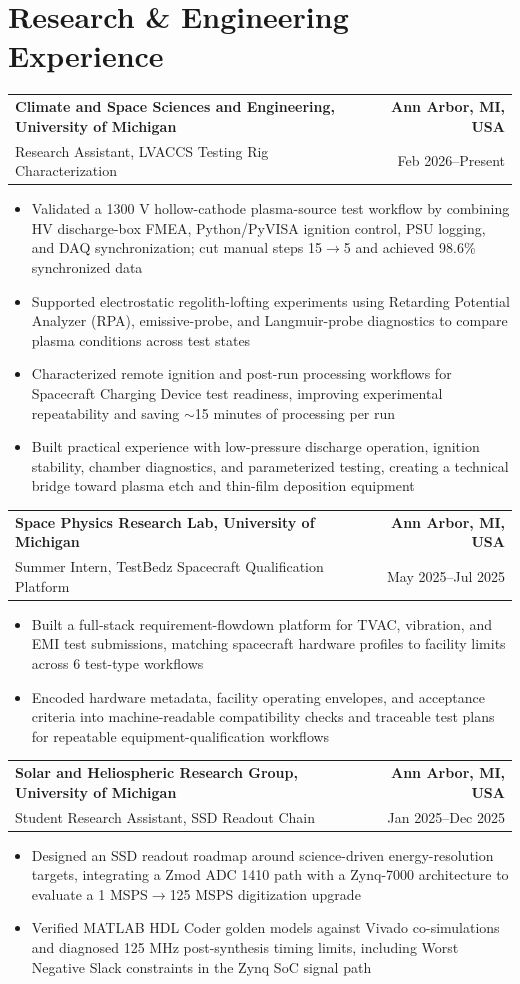 \documentclass[10pt,a4paper]{article}
\makeatletter
\newcommand{\resumeSubheading}[4]{%
  \begin{tabular*}{\textwidth}{@{\extracolsep{\fill}}l r}
    \textbf{#1} & \textcolor{nameblue}{\textbf{#2}} \\
    #3 & #4
  \end{tabular*}\vspace{-1.6pt}
}
\newcommand{\resumeItemsStart}{\begin{itemize}}
\newcommand{\resumeItemsEnd}{\end{itemize}\vspace{-1.1pt}}
\newcommand{\resumeItem}[1]{\item #1}
\makeatother
\begin{document}
\section{Research \& Engineering Experience}

\resumeSubheading
  {Climate and Space Sciences and Engineering, University of Michigan}{Ann Arbor, MI, USA}
  {Research Assistant, LVACCS Testing Rig Characterization}{Feb 2026--Present}
\resumeItemsStart
  \resumeItem{Validated a 1300 V hollow-cathode plasma-source test workflow by combining HV discharge-box FMEA, Python/PyVISA ignition control, PSU logging, and DAQ synchronization; cut manual steps 15$\rightarrow$5 and achieved 98.6\% synchronized data}
  \resumeItem{Supported electrostatic regolith-lofting experiments using Retarding Potential Analyzer (RPA), emissive-probe, and Langmuir-probe diagnostics to compare plasma conditions across test states}
  \resumeItem{Characterized remote ignition and post-run processing workflows for Spacecraft Charging Device test readiness, improving experimental repeatability and saving $\sim$15 minutes of processing per run}
  \resumeItem{Built practical experience with low-pressure discharge operation, ignition stability, chamber diagnostics, and parameterized testing, creating a technical bridge toward plasma etch and thin-film deposition equipment}
\resumeItemsEnd

\resumeSubheading
  {Space Physics Research Lab, University of Michigan}{Ann Arbor, MI, USA}
  {Summer Intern, TestBedz Spacecraft Qualification Platform}{May 2025--Jul 2025}
\resumeItemsStart
  \resumeItem{Built a full-stack requirement-flowdown platform for TVAC, vibration, and EMI test submissions, matching spacecraft hardware profiles to facility limits across 6 test-type workflows}
  \resumeItem{Encoded hardware metadata, facility operating envelopes, and acceptance criteria into machine-readable compatibility checks and traceable test plans for repeatable equipment-qualification workflows}
\resumeItemsEnd

\resumeSubheading
  {Solar and Heliospheric Research Group, University of Michigan}{Ann Arbor, MI, USA}
  {Student Research Assistant, SSD Readout Chain}{Jan 2025--Dec 2025}
\resumeItemsStart
  \resumeItem{Designed an SSD readout roadmap around science-driven energy-resolution targets, integrating a Zmod ADC 1410 path with a Zynq-7000 architecture to evaluate a 1 MSPS$\rightarrow$125 MSPS digitization upgrade}
  \resumeItem{Verified MATLAB HDL Coder golden models against Vivado co-simulations and diagnosed 125 MHz post-synthesis timing limits, including Worst Negative Slack constraints in the Zynq SoC signal path}
\resumeItemsEnd
\end{document}

